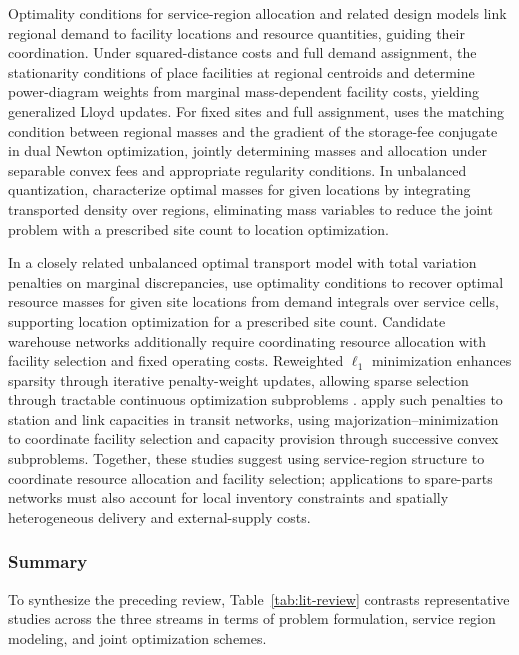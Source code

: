 \documentclass[a4paper,fleqn]{cas-sc}
\theoremstyle{remark}
\theoremstyle{plain}
\begin{document}
Optimality conditions for service-region allocation and related design models link regional demand to facility locations and resource quantities, guiding their coordination. Under squared-distance costs and full demand assignment, the stationarity conditions of \citet{bourne2015centroidal} place facilities at regional centroids and determine power-diagram weights from marginal mass-dependent facility costs, yielding generalized Lloyd updates. For fixed sites and full assignment, \citet{bansil2021generalstorage} uses the matching condition between regional masses and the gradient of the storage-fee conjugate in dual Newton optimization, jointly determining masses and allocation under separable convex fees and appropriate regularity conditions. In unbalanced quantization, \citet{bourne2018semi} characterize optimal masses for given locations by integrating transported density over regions, eliminating mass variables to reduce the joint problem with a prescribed site count to location optimization.

In a closely related unbalanced optimal transport model with total variation penalties on marginal discrepancies, \citet{chungunbalanced} use optimality conditions to recover optimal resource masses for given site locations from demand integrals over service cells, supporting location optimization for a prescribed site count. Candidate warehouse networks additionally require coordinating resource allocation with facility selection and fixed operating costs. Reweighted $\ell_1$ minimization enhances sparsity through iterative penalty-weight updates, allowing sparse selection through tractable continuous optimization subproblems \citep{candes2008enhancing}. \citet{realrojas2026rapid} apply such penalties to station and link capacities in transit networks, using majorization--minimization to coordinate facility selection and capacity provision through successive convex subproblems. Together, these studies suggest using service-region structure to coordinate resource allocation and facility selection; applications to spare-parts networks must also account for local inventory constraints and spatially heterogeneous delivery and external-supply costs.

\subsubsection{Summary}\label{subsec:literature_summary}

To synthesize the preceding review, Table~\ref{tab:lit-review} contrasts representative studies across the three streams in terms of problem formulation, service region modeling, and joint optimization schemes.
\end{document}
